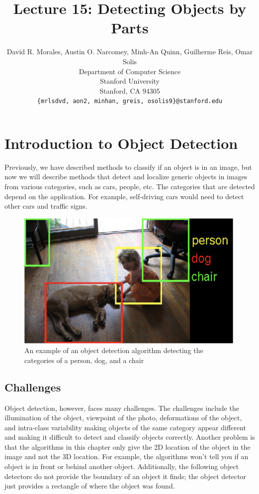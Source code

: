 \documentclass{article}
\title{Lecture 15: Detecting Objects by Parts}
\author{
  David R. Morales, Austin O. Narcomey, Minh-An Quinn, Guilherme Reis, Omar Solis \\
  Department of Computer Science\\
  Stanford University\\
  Stanford, CA 94305 \\
  \texttt{\{mrlsdvd, aon2, minhan, greis, osolis9\}@stanford.edu} 
}
\begin{document}
\maketitle


\section{Introduction to Object Detection}
Previously, we have described methods to classify if an object is in an image, but now we will describe methods that detect and localize generic objects in images from various categories, such as cars, people, etc. The categories that are detected depend on the application. For example, self-driving cars would need to detect other cars and traffic signs.
\begin{figure}[h]
	\includegraphics[width=\textwidth]{object-detector-intro.png}
    \caption{An example of an object detection algorithm detecting the categories of a person, dog, and a chair}
\end{figure}

\subsection{Challenges}
Object detection, however, faces many challenges. The challenges include the illumination of the object, viewpoint of the photo, deformations of the object, and intra-class variability making objects of the same category appear different and making it difficult to detect and classify objects correctly. Another problem is that the algorithms in this chapter only give the 2D location of the object in the image and not the 3D location. For example, the algorithms won't tell you if an object is in front or behind another object. Additionally, the following object detectors do not provide the boundary of an object it finds; the object detector just provides a rectangle of where the object was found.
\end{document}
